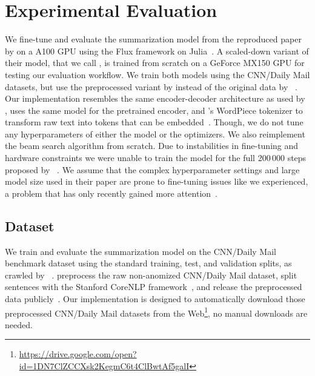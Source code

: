 \section{Experimental Evaluation} %

We fine-tune and evaluate the \BertSumAbs summarization model from the reproduced paper by \citeauthor{LiuL2019} on a A100 GPU using the Flux framework on Julia~\cite{InnesSFGRJKPS2018,BezansonEKS2017,LiuL2019}.
A scaled-down variant of their \TransformerAbs model, that we call \TransformerAbsTiny, is trained from scratch on a GeForce MX150 GPU for testing our evaluation workflow.
We train both models using the CNN/Daily Mail datasets, but use the preprocessed variant by \citeauthor{LiuL2019} instead of the original data by \citeauthor{HermannKGEKSB2015}~\cite{LiuL2019,HermannKGEKSB2015}.
Our implementation resembles the same encoder-decoder architecture as used by \citeauthor{LiuL2019}, uses the same \BertBase model for the pretrained encoder, and \Bert's WordPiece tokenizer to transform raw text into tokens that can be embedded~\cite{LiuL2019,DevlinCLT2019}.
Though, we do not tune any hyperparameters of either the model or the optimizers.
We also reimplement the beam search algorithm from scratch.
Due to instabilities in fine-tuning and hardware constraints we were unable to train the model for the full 200\,000 steps proposed by \citeauthor{LiuL2019}~\cite{LiuL2019}.
We assume that the complex hyperparameter settings and large model size used in their paper are prone to fine-tuning issues like we experienced, a problem that has only recently gained more attention~\cite{DodgeISFHS2020,ZhangWKWA2020,AghajanyanSGGZG2020}.

\subsection{Dataset}

We train and evaluate the summarization model on the CNN/Daily Mail benchmark dataset using the standard training, test, and validation splits, as crawled by \citeauthor{NallapatiZSGX2016}~\cite{HermannKGEKSB2015,NallapatiZSGX2016}.
\citeauthor{LiuL2019} preprocess the raw non-anomized CNN/Daily Mail dataset, split sentences with the Stanford CoreNLP framework~\cite{ManningSBFBM2014}, and release the preprocessed data publicly~\cite{LiuL2019}.
Our implementation is designed to automatically download those preprocessed CNN/Daily Mail datasets from the Web\footnote{\url{https://drive.google.com/open?id=1DN7ClZCCXsk2KegmC6t4ClBwtAf5galI}}, no manual downloads are needed.

